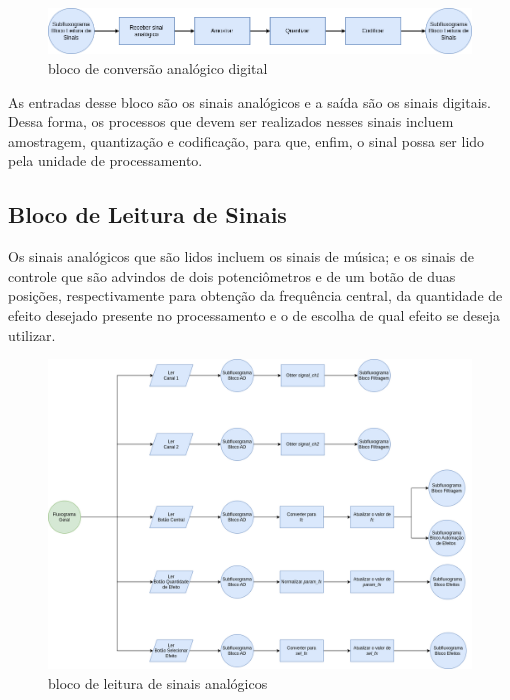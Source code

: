 \begin{figure}[h]
    \centering
    \includegraphics[width=\textwidth]{figuras/fig53.png}
    \caption{bloco de conversão analógico digital}
    \label{fig53}
\end{figure}

As entradas desse bloco são os sinais analógicos e a saída são os sinais digitais. Dessa forma, os processos que devem ser realizados nesses sinais incluem amostragem, quantização e codificação, para que, enfim, o sinal possa ser lido pela unidade de processamento.

\subsection{Bloco de Leitura de Sinais}

Os sinais analógicos que são lidos incluem os sinais de música; e os sinais de controle que são advindos de dois potenciômetros e de um botão de duas posições, respectivamente para obtenção da frequência central, da quantidade de efeito desejado presente no processamento e o de escolha de qual efeito se deseja utilizar. 


\begin{figure}[h]
    \centering
    \includegraphics[width=\textwidth]{figuras/fig54.png}
    \caption{bloco de leitura de sinais analógicos}
    \label{fig54}
\end{figure}

